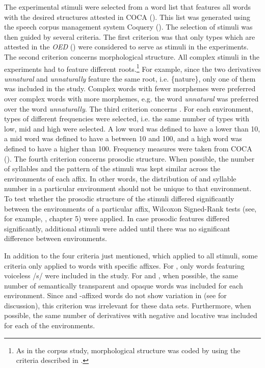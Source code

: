 The experimental stimuli were selected from a word list that features all words with the desired structures attested in  {COCA} (\citealt{Davies.20082014}). This list was generated using the speech corpus management system Coquery (\citealt{Kunter.2016}). The selection of stimuli was then guided by several criteria. 
The first criterion was that only types which are attested in the \textit{OED} (\citealt{OED.2013}) were considered to serve as stimuli in the experiments. 
The second criterion concerns morphological structure. All complex stimuli in the experiments had to feature different roots.\footnote{As in the corpus study, morphological structure was coded by using the criteria described in .} For example, since the two derivatives \textit{unnatural} and \textit{unnaturally} feature the same root, i.e. \{nature\}, only one of them was included in the study. Complex words with fewer morphemes were preferred over complex words with more morphemes, e.g. the word \textit{unnatural} was preferred over the word \textit{unnaturally}. 
 The third criterion concerns . For each environment, types of different frequencies were selected, i.e. the same number of types with low, mid and high  were selected. A low  word was defined to have a  lower than 10, a mid  word was defined to have a  between 10 and 100, and a high  word was defined to have a  higher than 100. Frequency measures were taken from  {COCA} (\citealt{Davies.20082014}).
  The fourth criterion concerns prosodic structure. When possible, the number of syllables and the  pattern of the stimuli was kept similar across the environments of each affix. In other words, the distribution of  and syllable number in a particular environment should not be unique to that environment. To test whether the prosodic structure of the stimuli differed significantly between the environments of a particular affix, Wilcoxon Signed-Rank tests (see, for example, \citealt{Crawley.2012}, chapter 5) were applied. In case prosodic features differed significantly, additional stimuli were added until there was no significant difference between environments.
 
 In addition to the four criteria just mentioned, which applied to all stimuli, some criteria only applied to words with specific affixes. 
 For , only words featuring voiceless /s/ were included in the study. 
  For  and , when possible, the same number of semantically transparent and opaque words was included for each environment. Since  and -affixed words do not show variation in  (see  for discussion), this criterion was irrelevant for these data sets.
 Furthermore, when possible, the same number of derivatives with negative and locative  was included for each of the environments. 
 
